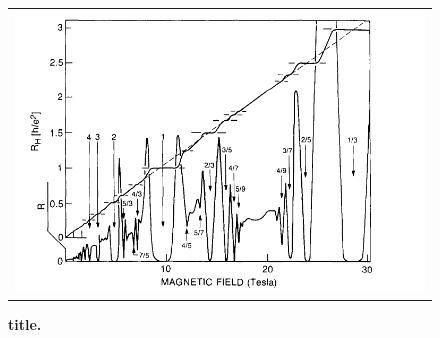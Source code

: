 \begin{figure}[hptb]
	\begin{center}
		\begin{tabular}{c}
			\includegraphics[width = 6.5 cm]{./chap2/fractional_Hall_resistance}
		\end{tabular}
	\end{center}
	
	\caption{\textbf{title.} }
	\label{fig: effet Hall quantique fractionnaire}
\end{figure}

